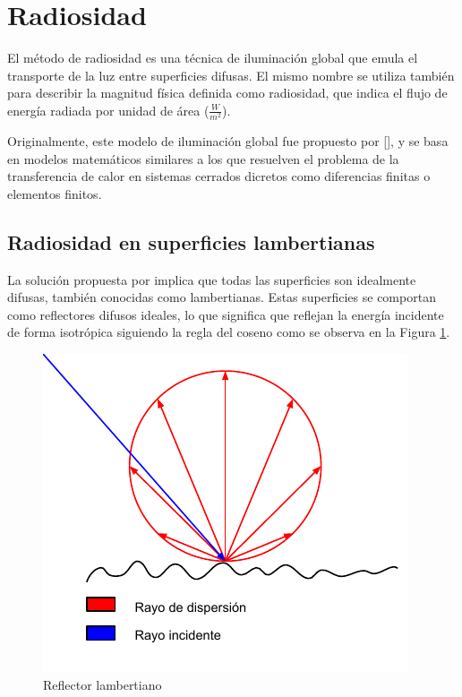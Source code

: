 \section{Radiosidad}
\label{sec:radiosidad}

El método de radiosidad es una técnica de iluminación global que emula el transporte de la luz entre superficies difusas. El mismo nombre se utiliza también para describir la magnitud física definida como radiosidad, que indica el flujo de energía radiada por unidad de área ($\frac{W}{m^{2}}$).

Originalmente, este modelo de iluminación global fue propuesto por [\citeauthor{Goral}], y se basa en modelos matemáticos similares a los que resuelven el problema de la transferencia de calor en sistemas cerrados dicretos como diferencias finitas o elementos finitos.

\subsection{Radiosidad en superficies lambertianas}

La solución propuesta por \citeauthor{Goral} implica que todas las superficies son idealmente difusas, también conocidas como lambertianas. Estas superficies se comportan como reflectores difusos ideales, lo que significa que reflejan la energía incidente de forma isotrópica siguiendo la regla del coseno como se observa en la Figura \ref{img:lamber}.

\vspace{5mm}
\begin{figure}[h]
	\centering
	\includegraphics[width=1\linewidth]{assets/lambert}
	\caption{Reflector lambertiano}
	\label{img:lamber}
\end{figure}

